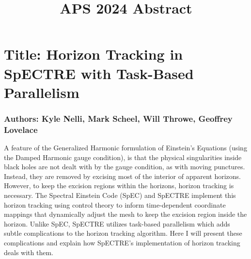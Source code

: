 \documentclass[12pt]{article}
\title{APS 2024 Abstract}
\author{\vspace{-5ex}}
\date{\vspace{-5ex}}
\begin{document}
\maketitle

\section*{Title: Horizon Tracking in SpECTRE with Task-Based Parallelism}

\subsubsection*{Authors: Kyle Nelli, Mark Scheel, Will Throwe, Geoffrey Lovelace}

A feature of the Generalized Harmonic formulation of Einstein's Equations (using the Damped Harmonic gauge condition), is that the physical singularities inside black holes are not dealt with by the gauge condition, as with moving punctures. Instead, they are removed by excising most of the interior of apparent horizons. However, to keep the excision regions within the horizons, horizon tracking is necessary. The Spectral Einstein Code (SpEC) and SpECTRE implement this horizon tracking using control theory to inform time-dependent coordinate mappings that dynamically adjust the mesh to keep the excision region inside the horizon. Unlike SpEC, SpECTRE utilizes task-based parallelism which adds subtle complications to the horizon tracking algorithm. Here I will present these complications and explain how SpECTRE's implementation of horizon tracking deals with them.
\end{document}
